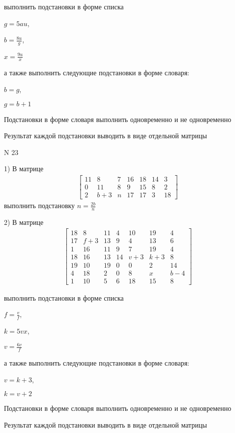 \documentclass[11pt]{report}
\begin{document}
выполнить подстановки в форме списка

$g=5 a u$,

$b=\frac{8 u}{g}$,

$x=\frac{9 u}{x}$

а также выполнить следующие подстановки в форме словаря:

$b=g$,

$g=b + 1$


    Подстановки в форме словаря выполнить одновременно и не одновременно


    Результат каждой подстановки выводить в виде отдельной матрицы

\newpage
N 23


    1) В матрице
\begin{align*}
\left[\begin{matrix}11 & 8 & 7 & 16 & 18 & 14 & 3\\0 & 11 & 8 & 9 & 15 & 8 & 2\\2 & b + 3 & n & 17 & 17 & 3 & 18\end{matrix}\right]
\end{align*}
выполнить подстановку $n=\frac{2 b}{n}$


    2) В матрице
\begin{align*}
\left[\begin{matrix}18 & 8 & 11 & 4 & 10 & 19 & 4\\17 & f + 3 & 13 & 9 & 4 & 13 & 6\\1 & 16 & 11 & 9 & 7 & 19 & 4\\18 & 16 & 13 & 14 & v + 3 & k + 3 & 8\\19 & 10 & 19 & 0 & 0 & 2 & 14\\4 & 18 & 2 & 0 & 8 & x & b - 4\\1 & 10 & 5 & 6 & 18 & 15 & 8\end{matrix}\right]
\end{align*}

выполнить подстановки в форме списка

$f=\frac{v}{f}$,

$k=5 v x$,

$v=\frac{6 v}{f}$

а также выполнить следующие подстановки в форме словаря:

$v=k + 3$,

$k=v + 2$


    Подстановки в форме словаря выполнить одновременно и не одновременно


    Результат каждой подстановки выводить в виде отдельной матрицы
\end{document}
